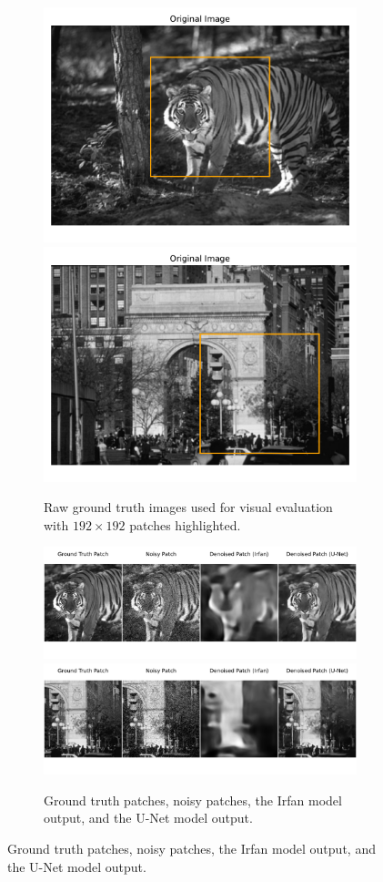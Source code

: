 \begin{figure}
    \centering
    \begin{subfigure}{\textwidth}
        \centering
        \includegraphics[trim={0 0.35cm 0 0.85cm},clip,width=0.49\linewidth]{img/ch6/n2n_imagenet/ground_truth_1.pdf}
        \includegraphics[trim={0 0.35cm 0 0.85cm},clip,width=0.49\linewidth]{img/ch6/n2n_imagenet/ground_truth_2.pdf}
        \caption{Raw ground truth images used for visual evaluation with $192 \times 192$ patches highlighted.}
    \end{subfigure}

    \vspace{1.5cm}

    \begin{subfigure}{\textwidth}
        \centering
        \includegraphics[trim={0 1cm 0 0},clip,width=\textwidth]{img/ch6/n2n_imagenet/irfan_vs_unet_1.pdf}
        \includegraphics[trim={0 1cm 0 2cm},clip,width=\textwidth]{img/ch6/n2n_imagenet/irfan_vs_unet_2.pdf}
        \caption{Ground truth patches, noisy patches, the Irfan model output, and the U-Net model output.}
    \end{subfigure}
\end{figure}

